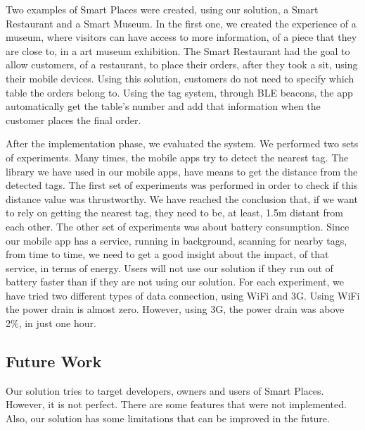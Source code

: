 Two examples of Smart Places were created, using our solution, a Smart Restaurant and a Smart Museum.
In the first one, we created the experience of a museum, where visitors can have access to more information, of a piece that they are close to, in a art museum exhibition.
The Smart Restaurant had the goal to allow customers, of a restaurant, to place their orders, after they took a sit, using their mobile devices.
Using this solution, customers do not need to specify which table the orders belong to. Using the tag system, through \gls{BLE} beacons, the app automatically get the table's number and add that information when the customer places the final order.

After the implementation phase, we evaluated the system.
We performed two sets of experiments.
Many times, the mobile apps try to detect the nearest tag.
The library we have used in our mobile apps, have means to get the distance from the detected tags.
The first set of experiments was performed in order to check if this distance value was thrustworthy.
We have reached the conclusion that, if we want to rely on getting the nearest tag, they need to be, at least, 1.5m distant from each other.
The other set of experiments was about battery consumption.
Since our mobile app has a service, running in background, scanning for nearby tags, from time to time, we need to get a good insight about the impact, of that service, in terms of energy.
Users will not use our solution if they run out of battery faster than if they are not using our solution.
For each experiment, we have tried two different types of data connection, using \gls{WiFi} and \gls{3G}.
Using \gls{WiFi} the power drain is almost zero.
However, using \gls{3G}, the power drain was above 2\%, in just one hour.

\subsection{Future Work}
\label{sec:conclusion_future_work}
Our solution tries to target developers, owners and users of Smart Places.
However, it is not perfect.
There are some features that were not implemented. Also, our solution has some limitations that can be improved in the future.

